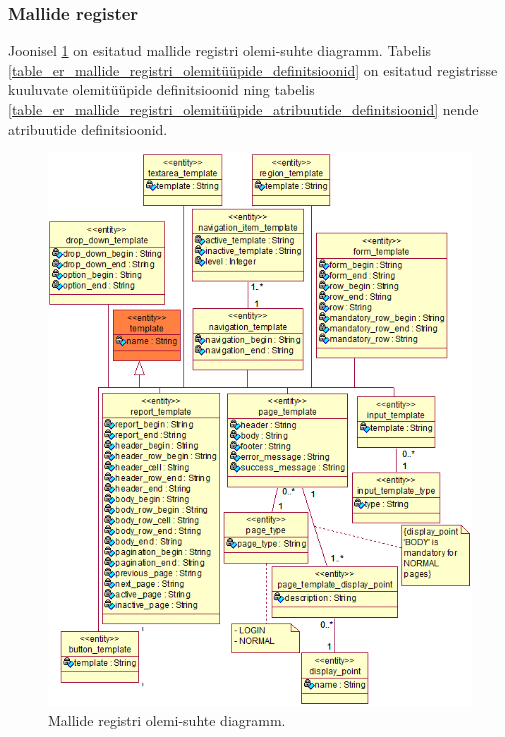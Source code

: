 \documentclass[a4paper,12pt]{article} %
\begin{document}
\subsubsection{Mallide register}
Joonisel \ref{fig_mallide_registri_olemi_suhte_diagramm} on esitatud mallide registri olemi-suhte diagramm. Tabelis \ref{table_er_mallide_registri_olemitüüpide_definitsioonid} on esitatud registrisse kuuluvate olemitüüpide definitsioonid ning tabelis \ref{table_er_mallide_registri_olemitüüpide_atribuutide_definitsioonid} nende atribuutide definitsioonid.

\begin{figure}[H]
\centering
\includegraphics[width=\textwidth]{./diagrams/template-er-diagram.png}
\caption{Mallide registri olemi-suhte diagramm.}
\label{fig_mallide_registri_olemi_suhte_diagramm}
\end{figure}
\end{document}
